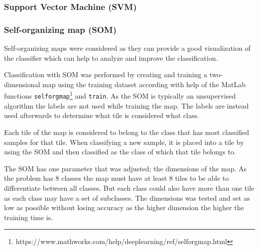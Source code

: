 \documentclass[doc/report.tex]{subfiles}
\begin{document}
\subsubsection{Support Vector Machine (SVM)}

\subsubsection{Self-organizing map (SOM)}
Self-organizing maps were considered as they can provide a good visualization
of the classifier which can help to analyze and improve the classification.

Classification with SOM was performed by creating and training a
two-dimensional map using the training dataset according with help of the
MatLab functions
\texttt{selforgmap}\footnote{https://www.mathworks.com/help/deeplearning/ref/selforgmap.html}
and \texttt{train}. As the SOM is typically an unsupervised algorithm the
labels are not used while training the map. The labels are instead used
afterwards to determine what tile is considered what class.

Each tile of the map is considered to belong to the class that has most
classified samples for that tile. When classifying a new sample, it is placed
into a tile by using the SOM and then classified as the class of which that
tile belongs to.

The SOM has one parameter that was adjusted; the dimensions of the map. As the
problem has 8 classes the map must have at least 8 tiles to be able to
differentiate between all classes. But each class could also have more than one
tile as each class may have a set of subclasses. The dimensions was tested and
set as low as possible without losing accuracy as the higher dimension the
higher the training time is.
\end{document}
